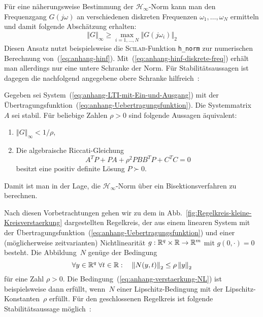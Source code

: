 Für eine näherungsweise Bestimmung der $\mathcal{H}_{\infty}$-Norm
kann man den Frequenzgang $G(j\omega)$ an verschiedenen diskreten
Frequenzen $\omega_{1},\ldots,\omega_{N}$ ermitteln und damit folgende
Abschätzung erhalten:
\begin{equation}
\left\Vert G\right\Vert _{\infty}\geq\max_{i=1,\ldots,N}\left\Vert G(j\omega_{i})\right\Vert _{2}\label{eq:anhang-hinf-diskrete-freq}
\end{equation}
Diesen Ansatz nutzt beispielsweise die \textsc{Scilab}-Funktion \hbox{\texttt{h\_norm}}
zur numerischen Berechnung von~(\ref{eq:anhang-hinf}). Mit~(\ref{eq:anhang-hinf-diskrete-freq})
erhält man allerdings nur eine untere Schranke der Norm. Für Stabilitätsaussagen
ist dagegen die nachfolgend angegebene obere Schranke hilfreich~\cite{hinrichsen1990,hinrichsen1990ijc}:
\begin{lemma}
\label{lem:real-bounded-lemma}Gegeben
sei System~(\ref{eq:anhang-LTI-mit-Ein-und-Ausgang}) mit der Übertragungsfunktion~(\ref{eq:anhang-Uebertragungsfunktion}).
Die Systemmatrix~$A$ sei stabil. Für beliebige Zahlen $\rho>0$
sind folgende Aussagen äquivalent:
\begin{enumerate}
\item $\left\Vert G\right\Vert _{\infty}<1/\rho$,
\item Die algebraische Riccati-Gleichung
\begin{equation}
A^{T}P+PA+\rho^{2}PBB^{T}P+C^{T}C=0\label{eq:anhang-Ricc1}
\end{equation}
besitzt eine positiv definite Lösung $P\succ0$.
\end{enumerate}
\end{lemma}
Damit ist man in der Lage, die $\mathcal{H}_{\infty}$-Norm über ein
Bisektionsverfahren zu berechnen. 

\bigskip{}

Nach diesen Vorbetrachtungen gehen wir zu dem in Abb.~\ref{fig:Regelkreis-kleine-Kreisverstaerkung}
dargestellten Regelkreis, der aus einem linearen System mit der Übertragungsfunktion~(\ref{eq:anhang-Uebertragungsfunktion})
und einer (möglicherweise zeit\-varianten) Nichtlinearität $g:{\mathbb{R}}^{q}\times{\mathbb{R}}\to{\mathbb{R}}^{m}$
mit $g(0,\cdot)=0$ besteht. Die Abbildung~$N$ genüge der Bedingung
\begin{equation}
\forall y\in{\mathbb{R}}^{q}\;\forall t\in{\mathbb{R}}:\quad\left\Vert N(y,t)\right\Vert _{2}\leq\rho\left\Vert y\right\Vert _{2}\label{eq:anhang-verstaerkung-NL}
\end{equation}
für eine Zahl $\rho>0$. Die Bedingung~(\ref{eq:anhang-verstaerkung-NL})
ist beispielsweise dann erfüllt, wenn~$N$ einer Lipschitz-Bedingung
mit der Lipschitz-Konstanten~$\rho$ erfüllt. Für den geschlossenen
Regelkreis ist folgende Stabilitätsaussage möglich~\cite{hinrichsen1986,hinrichsen1989}:

